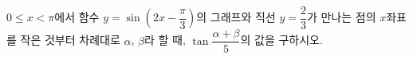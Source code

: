$0\le x<\pi$에서 함수 $y=\sin\left(2x-\dfrac{\pi}{3}\right)$의 그래프와 직선 $y=\dfrac{2}{3}$가 만나는 점의 $x$좌표를 작은 것부터 차례대로 $\alpha$, $\beta$라 할 때, $\tan\dfrac{\alpha+\beta}{5}$의 값을 구하시오.
